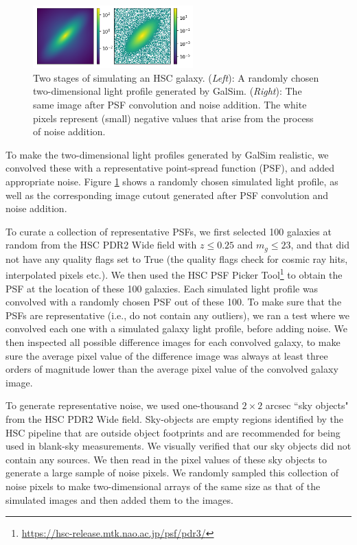 \begin{figure}[htb]
    \centering
    \includegraphics[width = 0.55\textwidth]{sim_process.png}
    \caption{Two stages of simulating an HSC galaxy. (\textit{Left}): A randomly chosen two-dimensional light profile generated by GalSim. (\textit{Right}): The same image after PSF convolution and noise addition. The white pixels represent (small) negative values that arise from the process of noise addition.}
    \label{fig_c2:sim_process}
\end{figure}

To make the two-dimensional light profiles generated by GalSim realistic, we convolved these with a representative point-spread function (PSF), and added appropriate noise. Figure \ref{fig_c2:sim_process} shows a randomly chosen simulated light profile, as well as the corresponding image cutout generated after PSF convolution and noise addition. 

To curate a collection of representative PSFs, we first selected 100 galaxies at random from the HSC PDR2 Wide field \citep{hsc_pdr3} with $z \leq 0.25$ and $m_g \leq 23$, and that did not have any quality flags set to True (the quality flags check for cosmic ray hits, interpolated pixels etc.). We then used the HSC PSF Picker Tool\footnote{\href{https://hsc-release.mtk.nao.ac.jp/psf/pdr3/}{https://hsc-release.mtk.nao.ac.jp/psf/pdr3/}} to obtain the PSF at the location of these 100 galaxies. Each simulated light profile was convolved with a randomly chosen PSF out of these 100. To make sure that the PSFs are representative (i.e., do not contain any outliers), we ran a test where we convolved each one with a simulated galaxy light profile, before adding noise. 
We then inspected all possible difference images for each convolved galaxy, to make sure the average pixel value of the difference image was always at least three orders of magnitude lower than the average pixel value of the convolved galaxy image.

To generate representative noise, we used one-thousand $2\times2$ arcsec ``sky objects" from the HSC PDR2 Wide field. Sky-objects are empty regions identified by the HSC pipeline that are outside object footprints and are recommended for being used in blank-sky measurements. We visually verified that our sky objects did not contain any sources. We then read in the pixel values of these sky objects to generate a large sample of noise pixels. We randomly sampled this collection of noise pixels to make two-dimensional arrays of the same size as that of the simulated images and then added them to the images.

